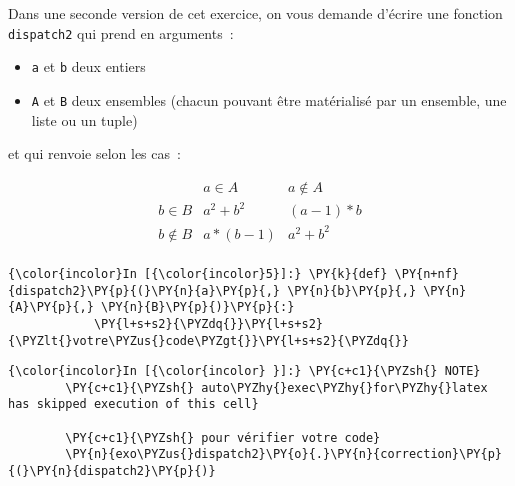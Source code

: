     Dans une seconde version de cet exercice, on vous demande d'écrire une
fonction \texttt{dispatch2} qui prend en arguments~:

\begin{itemize}
\tightlist
\item
  \texttt{a} et \texttt{b} deux entiers
\item
  \texttt{A} et \texttt{B} deux ensembles (chacun pouvant être
  matérialisé par un ensemble, une liste ou un tuple)
\end{itemize}

et qui renvoie selon les cas~:

\[
\begin{array}{c|c|c}
\ & a \in A & a\notin A \\
\hline
b\in B & a^2+b^2 & (a-1)*b\\
\hline
b\notin B & a*(b-1)& a^2+b^2\\
\end{array}
\]

    \begin{Verbatim}[commandchars=\\\{\},frame=single,framerule=0.3mm,rulecolor=\color{cellframecolor}]
{\color{incolor}In [{\color{incolor}5}]:} \PY{k}{def} \PY{n+nf}{dispatch2}\PY{p}{(}\PY{n}{a}\PY{p}{,} \PY{n}{b}\PY{p}{,} \PY{n}{A}\PY{p}{,} \PY{n}{B}\PY{p}{)}\PY{p}{:}
            \PY{l+s+s2}{\PYZdq{}}\PY{l+s+s2}{\PYZlt{}votre\PYZus{}code\PYZgt{}}\PY{l+s+s2}{\PYZdq{}}
\end{Verbatim}


    \begin{Verbatim}[commandchars=\\\{\},frame=single,framerule=0.3mm,rulecolor=\color{cellframecolor}]
{\color{incolor}In [{\color{incolor} }]:} \PY{c+c1}{\PYZsh{} NOTE}
        \PY{c+c1}{\PYZsh{} auto\PYZhy{}exec\PYZhy{}for\PYZhy{}latex has skipped execution of this cell}
        
        \PY{c+c1}{\PYZsh{} pour vérifier votre code}
        \PY{n}{exo\PYZus{}dispatch2}\PY{o}{.}\PY{n}{correction}\PY{p}{(}\PY{n}{dispatch2}\PY{p}{)}
\end{Verbatim}



    
    
    
